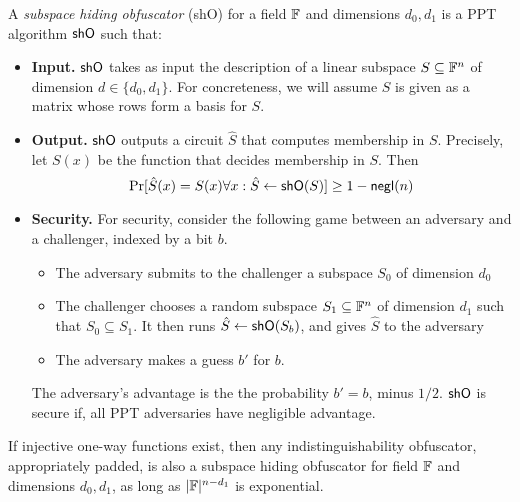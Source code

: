 \begin{definition} A \emph{subspace hiding obfuscator} (shO) for a field ${\mathbb F}$ and dimensions $d_0,d_1$ is a PPT algorithm ${\sf shO}$ such that:
	\begin{itemize}
		\item {\bf Input.} ${\sf shO}$ takes as input the description of a linear subspace $S\subseteq{\mathbb F}^n$ of dimension $d\in\{d_0,d_1\}$.  For concreteness, we will assume $S$ is given as a matrix whose rows form a basis for $S$.
		\item {\bf Output.} ${\sf shO}$ outputs a circuit $\hat{S}$ that computes membership in $S$.  Precisely, let $S(x)$ be the function that decides membership in $S$.  Then \[\Pr[\hat{S}(x)=S(x)\forall x:\hat{S}\gets{\sf shO}(S)]\geq 1-{\sf negl}(n)\]
		\item {\bf Security.} For security, consider the following game between an adversary and a challenger, indexed by a bit $b$.
		\begin{itemize}
			\item The adversary submits to the challenger a subspace $S_0$ of dimension $d_0$
			\item The challenger chooses a random subspace $S_1\subseteq {\mathbb F}^n$ of dimension $d_1$ such that $S_0\subseteq S_1$.  It then runs $\hat{S}\gets{\sf shO}(S_b)$, and gives $\hat{S}$ to the adversary
			\item The adversary makes a guess $b'$ for $b$.
		\end{itemize}
		The adversary's advantage is the the probability $b'=b$, minus $1/2$.  ${\sf shO}$ is secure if, all PPT adversaries have negligible advantage.
	\end{itemize}
\end{definition}

\begin{theorem}\label{thm:sho}If injective one-way functions exist, then any indistinguishability obfuscator, appropriately padded, is also a subspace hiding obfuscator for field ${\mathbb F}$ and dimensions $d_0,d_1$, as long as $|{\mathbb F}|^{n-d_1}$ is exponential.
\end{theorem}

